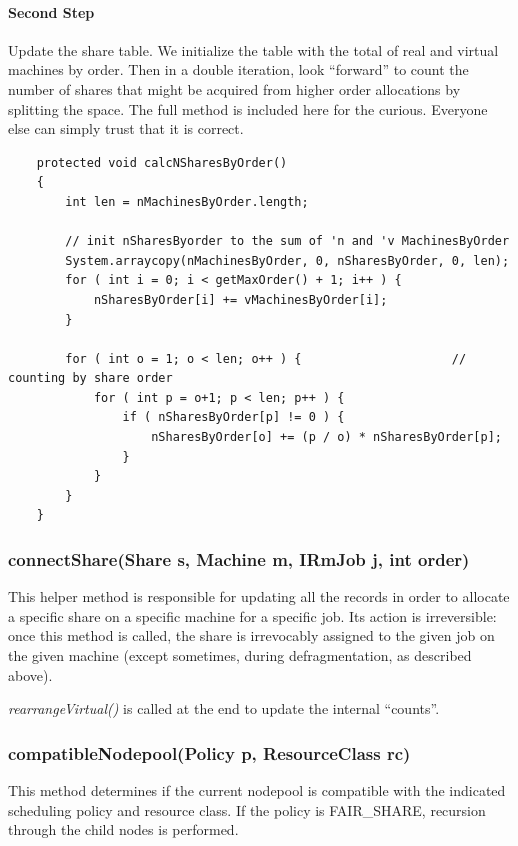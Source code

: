     \paragraph{Second Step} Update the share table.  We initialize the table with the total of real
    and virtual machines by order.  Then in a double iteration, look ``forward'' to count the number
    of shares that might be acquired from higher order allocations by splitting the space.  The full
    method is included here for the curious.  Everyone else can simply trust that it is correct.
\begin{verbatim}
    protected void calcNSharesByOrder()
    {
        int len = nMachinesByOrder.length;

        // init nSharesByorder to the sum of 'n and 'v MachinesByOrder
        System.arraycopy(nMachinesByOrder, 0, nSharesByOrder, 0, len);
        for ( int i = 0; i < getMaxOrder() + 1; i++ ) {
            nSharesByOrder[i] += vMachinesByOrder[i];
        }

        for ( int o = 1; o < len; o++ ) {                     // counting by share order
            for ( int p = o+1; p < len; p++ ) {
                if ( nSharesByOrder[p] != 0 ) {
                    nSharesByOrder[o] += (p / o) * nSharesByOrder[p];
                }
            }
        }
    }
\end{verbatim}
    
\subsubsection{connectShare(Share s, Machine m, IRmJob j, int order)}
    This helper method is responsible for updating all the records in order to
    allocate a specific share on a specific machine for a specific job.  Its
    action is irreversible: once this method is called, the share is irrevocably
    assigned to the given job on the given machine (except sometimes, during
    defragmentation, as described above).

    {\em rearrangeVirtual()} is called at the end to update the internal ``counts''.

\subsubsection{compatibleNodepool(Policy p,  ResourceClass rc)}
    This method determines if the current nodepool is compatible with the indicated
    scheduling policy and resource class.  If the policy is FAIR\_SHARE, recursion
    through the child nodes is performed.

